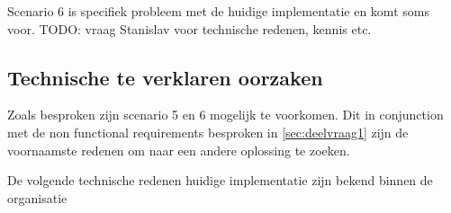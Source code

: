 Scenario 6 is specifiek probleem met de huidige implementatie en komt soms voor. 
TODO: vraag Stanislav voor technische redenen, kennis etc.
  



\subsection{Technische te verklaren oorzaken}

Zoals besproken zijn scenario 5 en 6 mogelijk te voorkomen. Dit in conjunction met de non functional requirements besproken in \ref{sec:deelvraag1} zijn de voornaamste redenen om naar een andere oplossing te zoeken.

De volgende technische redenen huidige implementatie zijn bekend binnen de organisatie


